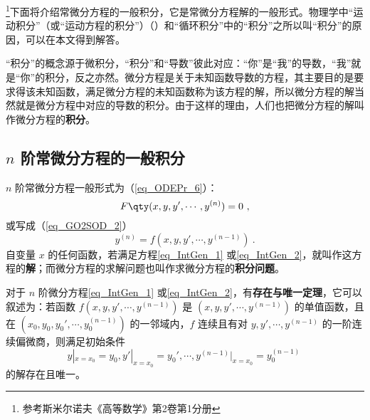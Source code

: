 \footnote{参考斯米尔诺夫《高等数学》第2卷第1分册}下面将介绍常微分方程的一般积分，它是常微分方程解的一般形式。物理学中“运动积分”（或“运动方程的积分”）（）和“循环积分”中的“积分”之所以叫“积分”的原因，可以在本文得到解答。

“积分”的概念源于微积分，“积分”和“导数”彼此对应：“你”是“我”的导数，“我”就是“你”的积分，反之亦然。微分方程是关于未知函数导数的方程，其主要目的是要求得该未知函数，满足微分方程的未知函数称为该方程的解，所以微分方程的解当然就是微分方程中对应的导数的积分。由于这样的理由，人们也把微分方程的解叫作微分方程的\textbf{积分}。
\subsection{$n$ 阶常微分方程的一般积分}
$n$ 阶常微分方程一般形式为（\autoref{eq_ODEPr_6}）：
\begin{equation}\label{eq_IntGen_1}
F \qty(x,y,y',\cdots,y^{(n)}) =0~,
\end{equation}
或写成（\autoref{eq_GO2SOD_2}）
\begin{equation}\label{eq_IntGen_2}
y^{(n)}=f(x,y,y',\cdots,y^{(n-1)})~.
\end{equation}
自变量 $x$ 的任何函数，若满足方程\autoref{eq_IntGen_1} 或\autoref{eq_IntGen_2}，就叫作这方程的\textbf{解}；而微分方程的求解问题也叫作求微分方程的\textbf{积分问题}。

对于 $n$ 阶微分方程\autoref{eq_IntGen_1} 或\autoref{eq_IntGen_2}，有\textbf{存在与唯一定理}，它可以叙述为：若函数 $f(x,y,y',\cdots,y^{(n-1)})$ 是 $(x,y,y',\cdots,y^{(n-1)})$ 的单值函数，且在 $(x_0,y_0,y_0',\cdots,y_0^{(n-1)})$ 的一邻域内，$f$ 连续且有对 $y,y',\cdots,y^{(n-1)}$ 的一阶连续偏微商，则满足初始条件
\begin{equation}\label{eq_IntGen_5}
y|_{x=x_0}=y_0,y'|_{x=x_0}=y_0',\cdots,y^{(n-1)}|_{x=x_0}=y_0^{(n-1)}~
\end{equation}
的解存在且唯一。

